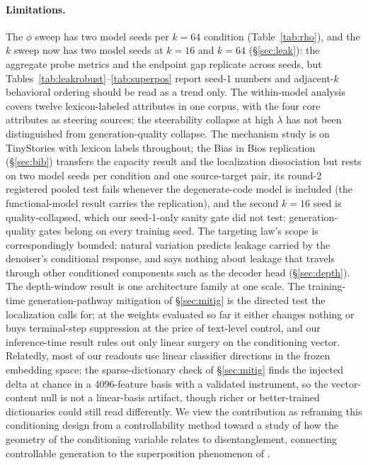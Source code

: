 \documentclass[11pt]{article}
\begin{document}
\paragraph{Limitations.} The $\phi$ sweep has two model seeds per $k{=}64$ condition
(Table~\ref{tab:rho}), and the $k$ sweep now has two model seeds at $k{=}16$ and
$k{=}64$ (\S\ref{sec:leak}): the aggregate probe metrics and the endpoint gap
replicate across seeds, but Tables~\ref{tab:leakrobust}--\ref{tab:superpos}
report seed-1 numbers and adjacent-$k$ behavioral ordering should be read as a
trend only. The within-model analysis covers twelve lexicon-labeled attributes in one corpus,
with the four core attributes as steering sources; the steerability collapse at
high $\lambda$ has not been distinguished from generation-quality collapse. The
mechanism study is on TinyStories with lexicon labels throughout; the Bias in
Bios replication (\S\ref{sec:bib}) transfers the capacity result and the
localization dissociation but rests on two model seeds per condition and one
source-target pair, its round-2 registered pooled test fails whenever the
degenerate-code model is included (the functional-model result carries the
replication), and the second $k{=}16$ seed is quality-collapsed, which our
seed-1-only sanity gate did not test: generation-quality gates belong on
every training seed. The targeting law's scope is correspondingly bounded:
natural variation predicts leakage carried by the denoiser's conditional
response, and says nothing about leakage that travels through other
conditioned components such as the decoder head (\S\ref{sec:depth}). The
depth-window result is one architecture family at one scale. The training-time generation-pathway mitigation of
\S\ref{sec:mitig} is the directed test the localization calls for; at the
weights evaluated so far it either changes nothing or buys terminal-step
suppression at the price of text-level control, and our inference-time result
rules out only linear surgery on the conditioning vector. Relatedly, most of our readouts use linear classifier directions in the frozen
embedding space; the sparse-dictionary check of \S\ref{sec:mitig} finds the
injected delta at chance in a 4096-feature basis with a validated instrument,
so the vector-content null is not a linear-basis artifact, though richer or
better-trained dictionaries could still read differently. We view the
contribution as reframing this conditioning design from a controllability method
toward a study of how the geometry of the conditioning variable relates to
disentanglement, connecting controllable generation to the superposition phenomenon
of \cite{manifold2026}.
\end{document}
